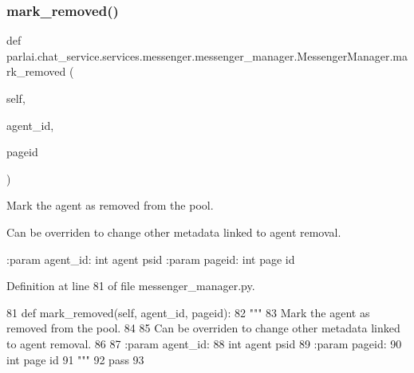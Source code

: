 \subsubsection{\texorpdfstring{mark\+\_\+removed()}{mark\_removed()}}
{\footnotesize\ttfamily def parlai.\+chat\+\_\+service.\+services.\+messenger.\+messenger\+\_\+manager.\+Messenger\+Manager.\+mark\+\_\+removed (\begin{DoxyParamCaption}\item[{}]{self,  }\item[{}]{agent\+\_\+id,  }\item[{}]{pageid }\end{DoxyParamCaption})}

\begin{DoxyVerb}Mark the agent as removed from the pool.

Can be overriden to change other metadata linked to agent removal.

:param agent_id:
    int agent psid
:param pageid:
    int page id
\end{DoxyVerb}
 

Definition at line 81 of file messenger\+\_\+manager.\+py.


\begin{DoxyCode}
81     \textcolor{keyword}{def }mark\_removed(self, agent\_id, pageid):
82         \textcolor{stringliteral}{"""}
83 \textcolor{stringliteral}{        Mark the agent as removed from the pool.}
84 \textcolor{stringliteral}{}
85 \textcolor{stringliteral}{        Can be overriden to change other metadata linked to agent removal.}
86 \textcolor{stringliteral}{}
87 \textcolor{stringliteral}{        :param agent\_id:}
88 \textcolor{stringliteral}{            int agent psid}
89 \textcolor{stringliteral}{        :param pageid:}
90 \textcolor{stringliteral}{            int page id}
91 \textcolor{stringliteral}{        """}
92         \textcolor{keywordflow}{pass}
93 
\end{DoxyCode}
\mbox{\label{classparlai_1_1chat__service_1_1services_1_1messenger_1_1messenger__manager_1_1MessengerManager_ab951bfae1eeb05f42e9fa215b2d019a7}} 
